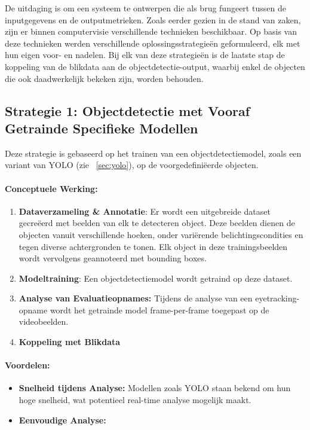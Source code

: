 De uitdaging is om een systeem te ontwerpen die als brug fungeert tussen de inputgegevens en de outputmetrieken.
Zoals eerder gezien in de stand van zaken, zijn er binnen computervisie verschillende technieken beschikbaar.
Op basis van deze technieken werden verschillende oplossingsstrategieën geformuleerd, elk met hun eigen voor- en nadelen.
Bij elk van deze strategieën is de laatste stap de koppeling van de blikdata aan de objectdetectie-output, 
waarbij enkel de objecten die ook daadwerkelijk bekeken zijn, worden behouden.

\subsection{Strategie 1: Objectdetectie met Vooraf Getrainde Specifieke Modellen}

Deze strategie is gebaseerd op het trainen van een objectdetectiemodel, zoals een variant van YOLO (zie ~\ref{sec:yolo}), 
op de voorgedefiniëerde objecten.

\paragraph{Conceptuele Werking:}
\begin{enumerate}
    \item \textbf{Dataverzameling \& Annotatie}: Er wordt een uitgebreide dataset gecreëerd met beelden van elk te detecteren object. 
    Deze beelden dienen de objecten vanuit verschillende hoeken, onder variërende belichtingscondities en tegen diverse achtergronden te tonen. 
    Elk object in deze trainingsbeelden wordt vervolgens geannoteerd met bounding boxes.
    \item \textbf{Modeltraining}: Een objectdetectiemodel wordt getraind op deze dataset.
    \item \textbf{Analyse van Evaluatieopnames:} Tijdens de analyse van een eyetracking-opname wordt het getrainde model frame-per-frame 
    toegepast op de videobeelden. 
    \item \textbf{Koppeling met Blikdata}
\end{enumerate}

\paragraph{Voordelen:}
\begin{itemize}
    \item \textbf{Snelheid tijdens Analyse:} Modellen zoals YOLO staan bekend om hun hoge snelheid, wat potentieel real-time analyse mogelijk maakt.
    \item \textbf{Eenvoudige Analyse:} %
\end{itemize}

